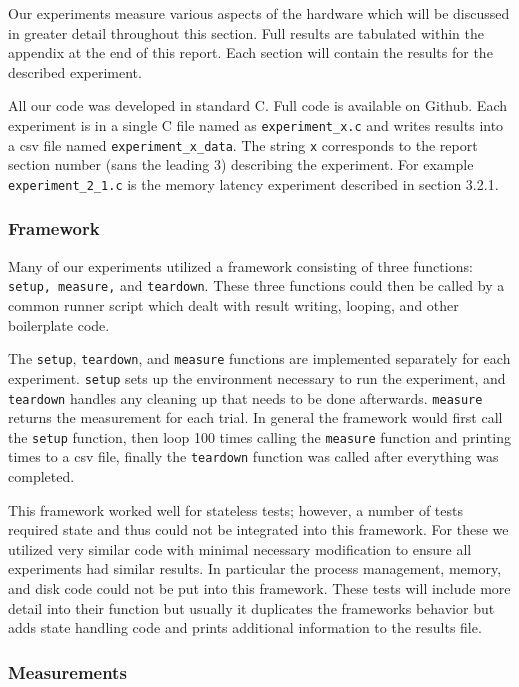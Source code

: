 Our experiments measure various aspects of the hardware which will be discussed in greater detail throughout this section.
Full results are tabulated within the appendix at the end of this report.
Each section will contain the results for the described experiment.

All our code was developed in standard C.
Full code is available on Github\cite{github}. 
Each experiment is in a single C file named as {\tt experiment\_x.c} and writes results into a csv file named {\tt experiment\_x\_data}.
The string {\tt x} corresponds to the report section number (sans the leading 3) describing the experiment.
For example {\tt experiment\_2\_1.c} is the memory latency experiment described in section 3.2.1.


\subsubsection{Framework}
Many of our experiments utilized a framework consisting of three functions: {\tt setup, measure,} and {\tt teardown}.
These three functions could then be called by a common runner script which dealt with result writing, looping, and other boilerplate code.

The {\tt setup}, {\tt teardown}, and {\tt measure} functions are implemented separately for each experiment. {\tt setup} sets up the environment necessary to run the experiment, and {\tt teardown} handles any cleaning up that needs to be done afterwards. {\tt measure} returns the measurement for each trial. 
In general the framework would first call the {\tt setup} function, then loop 100 times calling the {\tt measure} function and printing times to a csv file, finally the {\tt teardown} function was called after everything was completed.

This framework worked well for stateless tests; however, a number of tests required state and thus could not be integrated into this framework.
For these we utilized very similar code with minimal necessary modification to ensure all experiments had similar results.
In particular the process management, memory, and disk code could not be put into this framework.
These tests will include more detail into their function but usually it duplicates the frameworks behavior but adds state handling code and prints additional information to the results file.

\subsubsection{Measurements}

